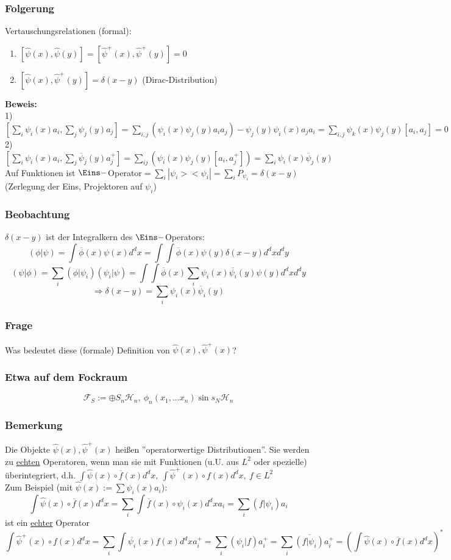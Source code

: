\documentclass[twoside,a4paper]{scrartcl}
\renewcommand{\1}{\mathds{1}}
\newcommand{\Ra}{\Rightarrow}
\renewcommand{\H}{\mathcal{H}}
\newcommand{\F}{\mathcal{F}}
\begin{document}
\subsubsection*{Folgerung}
Vertauschungsrelationen (formal):
\begin{enumerate}
\item $[\hat \psi(x), \hat \psi(y)]=[\hat \psi^+(x), \hat \psi^+(y)]=0$
\item $[\hat \psi(x), \hat \psi^+(y)]=\delta(x-y)$ (Dirac-Distribution)
\end{enumerate}
\textbf{Beweis:}\\
1) $[\sum_i \psi_i(x)a_i,\sum_j \psi_j(y)a_{j}]=\sum_{i,j}(\psi_i(x)\psi_j(y)a_ia_j)-\psi_j(y)\psi_i(x)a_ja_i=\sum_{i,j} \psi_k(x)\psi_j(y)[a_i,a_j]=0$\\
2) $[\sum_i \psi_i(x)a_i,\sum_j \overline{\psi}_j(y)a_{j}^+]=\sum_{ij} (\psi_i(x)\psi_j(y)[a_i,a_j^+])=\sum_i \psi_i(x) \overline{\psi}_j(y)$\\
Auf Funktionen ist $\Eins-$Operator$=\sum_i |\psi_i><\psi_i|=\sum_i P_{\psi_i}=\delta(x-y)$ (Zerlegung der Eins, Projektoren auf $\psi_i$)
\subsubsection*{Beobachtung}
$\delta(x-y)$ ist der Integralkern des $\Eins-$Operators:
$$(\phi|\psi)=\int \overline{\phi}(x)\psi(x)d^dx= \int \int \overline{\phi}(x)\psi(y) \delta(x-y)d^dxd^dy$$
$$(\psi|\phi)=\sum_i (\phi|\psi_i)(\psi_i|\psi)=\int \int \overline{\phi}(x)\sum_i \psi_i(x)\overline{\psi_i}(y)\psi(y) d^dxd^dy$$
$$\Ra \delta(x-y)=\sum_i {\psi_i}(x) \overline{\psi}_i(y)$$

\subsubsection*{Frage}
Was bedeutet diese (formale) Definition von $\hat \psi(x), \hat \psi^+(x)$?
\subsubsection*{Etwa auf dem Fockraum}
$$\F_S:= \oplus S_n\H_n, \ \phi_n(x_1,...x_n) \sin s_N \H_n$$

\subsubsection*{Bemerkung}
Die Objekte $\hat \psi(x), \hat \psi^+(x)$ heißen ''operatorwertige Distributionen''. Sie werden zu \underline{echten} Operatoren, wenn man sie mit Funktionen (u.U. aus $L^2$ oder spezielle) überintegriert, d.h. 
$\int \hat \psi(x) \circ \overline{f}(x) d^dx, \ \int \hat \psi^+(x) \circ {f}(x) d^dx, \ f \in L^2$\\
Zum Beispiel (mit $\hat \psi(x):= \sum \psi_i(x)a_i$):
$$\int \hat \psi(x) \circ \overline{f}(x) d^dx=\sum_i \int \overline{f}(x) \circ \psi_i(x) d^dx a_i=\sum_i (f|\psi_i)a_i$$
ist ein \underline{echter} Operator
$$\int \hat \psi^+(x) \circ {f}(x) d^dx=\sum_i \int \overline{\psi_i}(x) {f}(x)  d^dx a^+_i=\sum_i (\psi_i|f)a^+_i=\sum_i \overline{(f|\psi_i)}a^+_i=(\int \hat \psi(x) \circ \overline{f}(x) d^dx)^*$$
\end{document}
